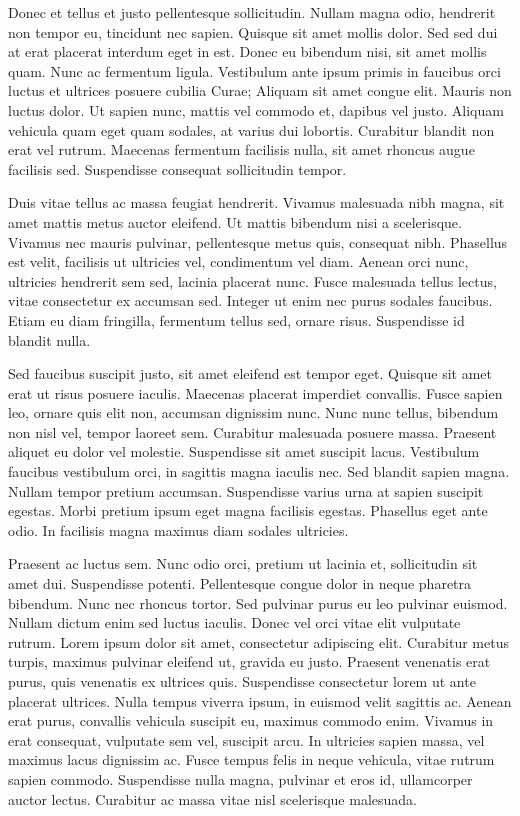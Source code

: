 Donec et tellus et justo pellentesque sollicitudin. Nullam magna odio, hendrerit non tempor eu, tincidunt nec sapien. Quisque sit amet mollis dolor. Sed sed dui at erat placerat interdum eget in est. Donec eu bibendum nisi, sit amet mollis quam. Nunc ac fermentum ligula. Vestibulum ante ipsum primis in faucibus orci luctus et ultrices posuere cubilia Curae; Aliquam sit amet congue elit. Mauris non luctus dolor. Ut sapien nunc, mattis vel commodo et, dapibus vel justo. Aliquam vehicula quam eget quam sodales, at varius dui lobortis. Curabitur blandit non erat vel rutrum. Maecenas fermentum facilisis nulla, sit amet rhoncus augue facilisis sed. Suspendisse consequat sollicitudin tempor.

Duis vitae tellus ac massa feugiat hendrerit. Vivamus malesuada nibh magna, sit amet mattis metus auctor eleifend. Ut mattis bibendum nisi a scelerisque. Vivamus nec mauris pulvinar, pellentesque metus quis, consequat nibh. Phasellus est velit, facilisis ut ultricies vel, condimentum vel diam. Aenean orci nunc, ultricies hendrerit sem sed, lacinia placerat nunc. Fusce malesuada tellus lectus, vitae consectetur ex accumsan sed. Integer ut enim nec purus sodales faucibus. Etiam eu diam fringilla, fermentum tellus sed, ornare risus. Suspendisse id blandit nulla.

Sed faucibus suscipit justo, sit amet eleifend est tempor eget. Quisque sit amet erat ut risus posuere iaculis. Maecenas placerat imperdiet convallis. Fusce sapien leo, ornare quis elit non, accumsan dignissim nunc. Nunc nunc tellus, bibendum non nisl vel, tempor laoreet sem. Curabitur malesuada posuere massa. Praesent aliquet eu dolor vel molestie. Suspendisse sit amet suscipit lacus. Vestibulum faucibus vestibulum orci, in sagittis magna iaculis nec. Sed blandit sapien magna. Nullam tempor pretium accumsan. Suspendisse varius urna at sapien suscipit egestas. Morbi pretium ipsum eget magna facilisis egestas. Phasellus eget ante odio. In facilisis magna maximus diam sodales ultricies.

Praesent ac luctus sem. Nunc odio orci, pretium ut lacinia et, sollicitudin sit amet dui. Suspendisse potenti. Pellentesque congue dolor in neque pharetra bibendum. Nunc nec rhoncus tortor. Sed pulvinar purus eu leo pulvinar euismod. Nullam dictum enim sed luctus iaculis. Donec vel orci vitae elit vulputate rutrum.
Lorem ipsum dolor sit amet, consectetur adipiscing elit. Curabitur metus turpis, maximus pulvinar eleifend ut, gravida eu justo. Praesent venenatis erat purus, quis venenatis ex ultrices quis. Suspendisse consectetur lorem ut ante placerat ultrices. Nulla tempus viverra ipsum, in euismod velit sagittis ac. Aenean erat purus, convallis vehicula suscipit eu, maximus commodo enim. Vivamus in erat consequat, vulputate sem vel, suscipit arcu. In ultricies sapien massa, vel maximus lacus dignissim ac. Fusce tempus felis in neque vehicula, vitae rutrum sapien commodo. Suspendisse nulla magna, pulvinar et eros id, ullamcorper auctor lectus. Curabitur ac massa vitae nisl scelerisque malesuada.


